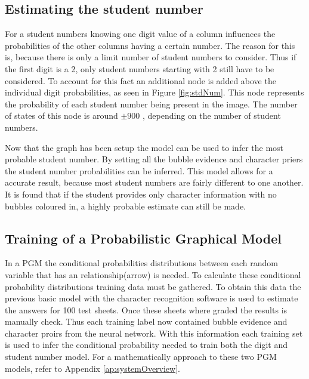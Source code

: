 
\subsection{Estimating the student number}
\label{sec:studentNumber}

For a student numbers knowing one digit value of a column influences the probabilities of the other columns having a certain number. The reason for this is, because there is only a limit number of student numbers to consider. Thus if the first digit is a 2, only student numbers starting with 2 still have to be considered. To account for this fact an additional node is added above the individual digit probabilities, as seen in Figure \ref{fig:stdNum}. This node represents the probability of each student number being present in the image. The number of states of this node is around $\pm 900$ , depending on the number of student numbers.

Now that the graph has been setup the model can be used to infer the most probable student number. By setting all the bubble evidence and character priers the student number probabilities can be inferred. This model allows for a accurate result, because most student numbers are fairly different to one another. It is found that if the student provides only character information with no bubbles coloured in, a highly probable estimate can still be made.

\subsection{Training of a Probabilistic Graphical Model}
In a PGM the conditional probabilities distributions between each random variable that has an relationship(arrow) is needed. 
To calculate these conditional probability distributions training data must be gathered. To obtain this  data the previous basic model with the character recognition software is used to estimate the answers for 100 test sheets. Once these sheets where graded the results is manually check. Thus each training label now contained bubble evidence and character proirs from the neural network. With this information each training set is used to infer the conditional probability needed to train both the digit and student number model. For a mathematically approach to these two PGM models, refer to Appendix \ref{ap:systemOverview}.

